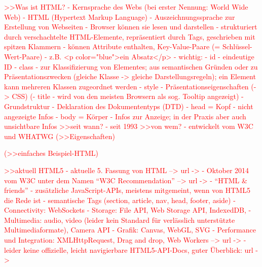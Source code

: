 \documentclass[a4paper, 12pt, hidelinks, listof=totoc, listoftables=totoc, bibliography=totoc]{scrreprt}
\newcommand{\TODO}[1]{\textcolor{red}{#1}\newline}
\begin{document}
\TODO{>>Was ist HTML?
	- Kernsprache des Webs (bei erster Nennung: World Wide Web)
	- HTML (Hypertext Markup Language)
	- Auszeichnungssprache zur Erstellung von Webseiten
	- Browser können sie lesen und darstellen
	- strukturiert durch verschachtelte HTML-Elemente, repräsentiert durch Tags, geschrieben mit spitzen Klammern
		- können Attribute enthalten, Key-Value-Paare (= Schlüssel-Wert-Paare)
		- z.B. <p color="blue">ein Absatz</p>
		- wichtig:
			- id - eindeutige ID
			- class - zur Klassifizierung von Elementes; aus semantischen Gründen oder zu Präsentationszwecken (gleiche Klasse -> gleiche Darstellungsregeln); ein Element kann mehreren Klassen zugeordnet werden
			- style - Präsentationseigenschaften (-> CSS)
			(- title - wird von den meisten Browsern als sog. Tooltip angezeigt)
	- Grundstruktur
		- Deklaration des Dokumententyps (DTD)
		- head = Kopf - nicht angezeigte Infos
		- body = Körper - Infos zur Anzeige; in der Praxis aber auch unsichtbare Infos
}
\TODO{>>seit wann?
	- seit 1993}
\TODO{>>von wem?
	- entwickelt vom W3C und WHATWG}
\TODO{(>>Eigenschaften)}

\TODO{(>>einfaches Beispiel-HTML)}

\TODO{>>aktuell HTML5}
\TODO{	- aktuelle 5. Fassung von HTML  -->  url -> %
	}
\TODO{	- Oktober 2014 vom W3C unter dem Namen "`W3C Recommendation"'  -->  url -> %
}
\TODO{	- "`HTML \& friends"' - zusätzliche JavaScript-APIs, meistens mitgemeint, wenn von HTML5 die Rede ist
		- semantische Tags (section, article, nav, head, footer, aside)
		- Connectivity: WebSockets
		- Storage: File API, Web Storage API, IndexedDB, 
		- Multimedia: audio, video (leider kein Standard für verlässlich unterstützte Multimediaformate), Camera API
		- Grafik: Canvas, WebGL, SVG
		- Performance und Integration: XMLHttpRequest, Drag and drop, Web Workers}
\TODO{	-->  url -> %
}
\TODO{	- leider keine offizielle, leicht navigierbare HTML5-API-Docs, guter Überblick: url -> %
}
\end{document}
